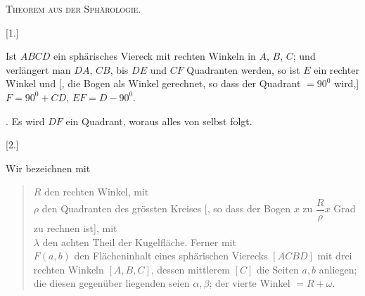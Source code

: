 \clearpage
{}%
\begin{center}
{\Large\textsc{Theorem aus der Sph\"arologie.}}
\end{center}

\begin{center}\begin{minipage}{\linewidth}\centering\end{minipage}\end{center}

[1.]

Ist $ABCD$ ein sph\"arisches Viereck mit rechten Winkeln in $A$, $B$, $C$; und verl\"angert man $DA$, $CB$, bis $DE$ und $CF$ Quadranten werden, so ist $E$ ein rechter Winkel und [, die Bogen als Winkel gerechnet, so dass der Quadrant $= 90^{0}$ wird,] $F = 90^{0} + CD$, $EF = D - 90^{0}$.

. Es wird $DF$ ein Quadrant, woraus alles von selbst folgt.

[2.]

Wir bezeichnen mit

\begin{quote}
$R$ den rechten Winkel, mit\\
$\rho$ den Quadranten des gr\"ossten Kreises [, so dass der Bogen $x$ zu $\dfrac{R}{\rho}x$ Grad zu rechnen ist], mit\\
$\lambda$ den achten Theil der Kugelfl\"ache. Ferner mit\\
$F(a,b)$ den Fl\"acheninhalt eines sph\"arischen Vierecks $[ACBD]$ mit drei rechten Winkeln $[A, B, C]$, dessen mittlerem $[C]$ die Seiten $a, b$ anliegen; die diesen gegen\"uber liegenden seien $\alpha, \beta$; der vierte Winkel $= R + \omega$.
\end{quote}
